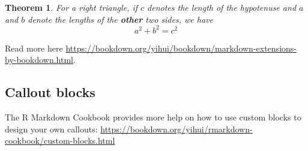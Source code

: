 \documentclass[
]{html}
\newtheorem{theorem}{Theorem}[section]
\theoremstyle{definition}
\theoremstyle{definition}
\theoremstyle{definition}
\theoremstyle{definition}
\theoremstyle{remark}
\begin{document}
\begin{theorem}
\protect\hypertarget{thm:tri}{}\label{thm:tri}For a right triangle, if \(c\) denotes the \emph{length} of the hypotenuse
and \(a\) and \(b\) denote the lengths of the \textbf{other} two sides, we have
\[a^2 + b^2 = c^2\]
\end{theorem}

Read more here \url{https://bookdown.org/yihui/bookdown/markdown-extensions-by-bookdown.html}.

\hypertarget{callout-blocks}{%
\subsection{Callout blocks}\label{callout-blocks}}

The R Markdown Cookbook provides more help on how to use custom blocks to design your own callouts: \url{https://bookdown.org/yihui/rmarkdown-cookbook/custom-blocks.html}

  
\end{document}
